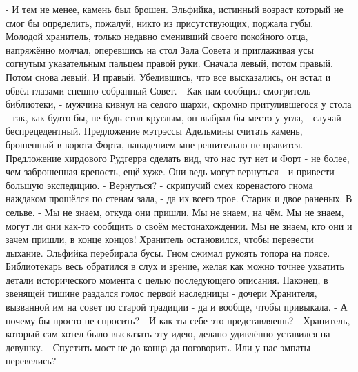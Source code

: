 
- И тем не менее, камень был брошен.
Эльфийка, истинный возраст который не смог бы определить, пожалуй, никто из присутствующих, поджала губы. Молодой хранитель, только недавно сменивший своего покойного отца, напряжённо молчал, оперевшись на стол Зала Совета и приглаживая усы согнутым указательным пальцем правой руки. Сначала левый, потом правый. Потом снова левый. И правый. Убедившись, что все высказались, он встал и обвёл глазами спешно собранный Совет.
- Как нам сообщил смотритель библиотеки, - мужчина кивнул на седого шархи, скромно притулившегося у стола - так, как будто бы, не будь стол круглым, он выбрал бы место у угла, - случай беспрецедентный. Предложение мэтрэссы Адельмины считать камень, брошенный в ворота Форта, нападением мне решительно не нравится. Предложение хирдового Рудгерра сделать вид, что нас тут нет и Форт - не более, чем заброшенная крепость, ещё хуже. Они ведь могут вернуться - и привести большую экспедицию.
- Вернуться? - скрипучий смех коренастого гнома наждаком прошёлся по стенам зала, - да их всего трое. Старик и двое раненых. В сельве.
- Мы не знаем, откуда они пришли. Мы не знаем, на чём. Мы не знаем, могут ли они как-то сообщить о своём местонахождении. Мы не знаем, кто они и зачем пришли, в конце концов!
Хранитель остановился, чтобы перевести дыхание. Эльфийка перебирала бусы. Гном сжимал рукоять топора на поясе. Библиотекарь весь обратился в слух и зрение, желая как можно точнее ухватить детали исторического момента с целью последующего описания.
Наконец, в звенящей тишине раздался голос первой наследницы - дочери Хранителя, вызванной им на совет по старой традиции - да и вообще, чтобы привыкала.
- А почему бы просто не спросить?
- И как ты себе это представляешь? - Хранитель, который сам хотел было высказать эту идею, делано удивлённо уставился на девушку.
- Спустить мост не до конца да поговорить. Или у нас эмпаты перевелись?

